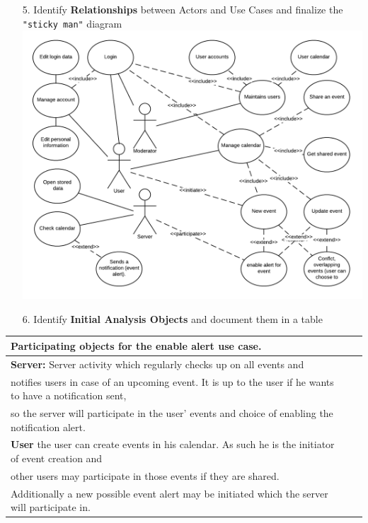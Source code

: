 \documentclass{article}
\begin{document}
	\pagebreak{}

\begin{enumerate}
		\item[5.] Identify \textbf{Relationships} between Actors and Use Cases and finalize the \verb= "sticky man"=  diagram\\
		\includegraphics[scale = 0.38]{UserCases.png}\\
		\pagebreak{}
		\item[6.] Identify \textbf{Initial Analysis Objects} and document them in a table\\
\end{enumerate}

\begin{tabular}{l r @{} l}
	\textbf{Participating objects for the enable alert use case.}\\
	\hline
	\textbf{Server:} Server activity which regularly checks up on all events and \\
	notifies users in case of an upcoming event. It is up to the user if he wants to have a notification sent,\\ 
	so the server will participate in the user’ events and choice of enabling the notification alert.\\
	\hline
	\textbf{User} the user can create events in his calendar. As such he is the initiator of event creation and \\
	other users may participate in those events if they are shared. \\
	Additionally a new possible event alert may be initiated which the server will participate in.\\
	\hline
\end{tabular}
	\\
\end{document}
